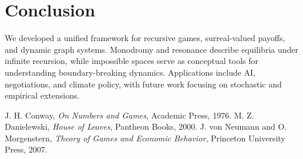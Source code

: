 \documentclass[12pt]{article}
\begin{document}
\section{Conclusion}
We developed a unified framework for recursive games, surreal-valued payoffs, and dynamic graph systems. Monodromy and resonance describe equilibria under infinite recursion, while impossible spaces serve as conceptual tools for understanding boundary-breaking dynamics. Applications include AI, negotiations, and climate policy, with future work focusing on stochastic and empirical extensions.

\begin{thebibliography}{9}
 J. H. Conway, \textit{On Numbers and Games}, Academic Press, 1976.
 M. Z. Danielewski, \textit{House of Leaves}, Pantheon Books, 2000.
 J. von Neumann and O. Morgenstern, \textit{Theory of Games and Economic Behavior}, Princeton University Press, 2007.
\end{thebibliography}
\end{document}
